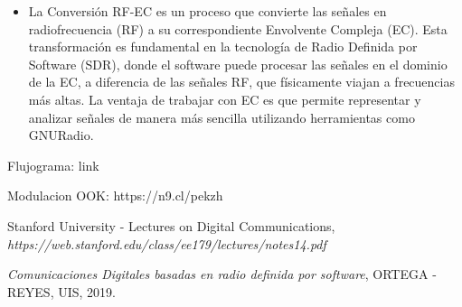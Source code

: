 \documentclass{journal}[IEEEtran, twocolumn]             %
\begin{document}
\begin{multicols}{2}
\begin{itemize}
    
    \item La Conversión RF-EC es un proceso que convierte las señales en radiofrecuencia (RF) a su correspondiente Envolvente Compleja (EC). Esta transformación es fundamental en la tecnología de Radio Definida por Software (SDR), donde el software puede procesar las señales en el dominio de la EC, a diferencia de las señales RF, que físicamente viajan a frecuencias más altas. La ventaja de trabajar con EC es que permite representar y analizar señales de manera más sencilla utilizando herramientas como GNURadio.

\end{itemize}

\begin{thebibliography}{1}

Flujograma: link

Modulacion OOK: https://n9.cl/pekzh

Stanford University - Lectures on Digital Communications, \textit{https://web.stanford.edu/class/ee179/lectures/notes14.pdf}

\textit{Comunicaciones Digitales basadas en radio definida por software}, ORTEGA - REYES, UIS, 2019.

\end{thebibliography}

\end{multicols}
\end{document}
